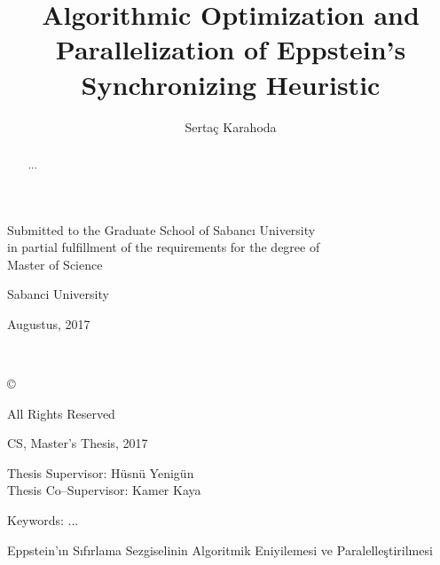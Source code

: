 \documentclass[12pt]{article}
\title{Algorithmic Optimization and Parallelization of Eppstein's Synchronizing Heuristic}
\author{Serta\c{c} Karahoda}
\date{}
\begin{document}
\maketitle
\thispagestyle{empty}
\vspace{1cm}

\begin{center}
Submitted to the Graduate School of Sabanc{\i} University \\
in partial fulfillment of the requirements for the degree of \\
Master of Science
\end{center}

\vspace{2cm}

\begin{center}
Sabanci University
\end{center}

\begin{center}
Augustus, 2017
\end{center}


\newpage
$ $
\thispagestyle{empty}
\newpage
$ $
\vspace{5cm}
\begin{center}
\copyright \hspace{0.1cm} \MyAuthor{}

All Rights Reserved
\thispagestyle{empty}
\end{center}
\newpage

\begin{center}
\large
\MyTitle
\end{center}

\begin{center}
\MyAuthor

CS, Master's Thesis, 2017

Thesis Supervisor: H\"{u}sn\"{u} Yenig\"{u}n\\
Thesis Co--Supervisor: Kamer Kaya
\end{center}

\begin{center}
Keywords: ...
\end{center}

\begin{abstract}
...
\end{abstract}
\newpage

\begin{center}
\large
Eppstein'\i{}n S\i{}f\i{}rlama Sezgiselinin Algoritmik Eniyilemesi ve Paralelle\c{s}tirilmesi
\end{center}
\end{document}
